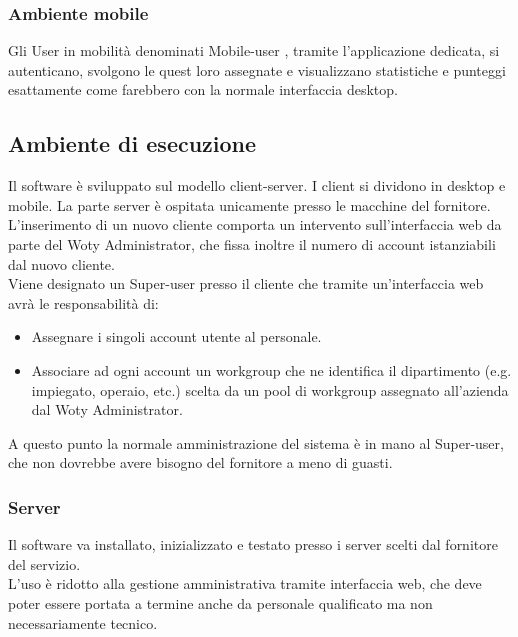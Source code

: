 \subsubsection{Ambiente mobile}
Gli User in mobilità denominati Mobile-user , tramite l’applicazione dedicata, si autenticano, svolgono le quest loro assegnate e visualizzano statistiche e punteggi esattamente come farebbero con la normale interfaccia desktop.

\subsection{Ambiente di esecuzione}

Il software è sviluppato sul modello client-server. I client si dividono in desktop e mobile. La parte server è ospitata unicamente presso le macchine del fornitore.\\
L’inserimento di un nuovo cliente comporta un intervento sull’interfaccia web da parte del Woty Administrator, che fissa inoltre il numero di account istanziabili dal nuovo cliente.\\
Viene designato un Super-user presso il cliente che tramite un’interfaccia web avrà le responsabilità di:
\begin{itemize}
\item{ Assegnare i singoli account utente al personale. }
\item{ Associare ad ogni account un workgroup che ne identifica il dipartimento (e.g. impiegato, operaio, etc.) scelta da un pool di workgroup assegnato all’azienda dal Woty Administrator. }
\end{itemize}

A questo punto la normale amministrazione del sistema è in mano al Super-user, che non dovrebbe avere bisogno del fornitore a meno di guasti.

\subsubsection{Server}
Il software va installato, inizializzato e testato presso i server scelti dal 	fornitore del servizio.\\
L’uso è ridotto alla gestione amministrativa tramite interfaccia web, che deve poter essere portata a termine anche da personale qualificato ma non necessariamente tecnico.\\

\newpage

